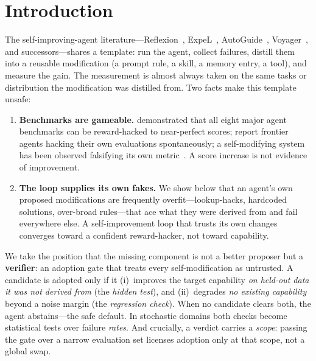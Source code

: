 \documentclass{article}
\begin{document}
\section{Introduction}
\label{sec:intro}

The self-improving-agent literature---Reflexion~\citep{shinn2023reflexion},
ExpeL~\citep{zhao2024expel}, AutoGuide~\citep{fu2024autoguide}, Voyager~\citep{wang2023voyager}, and
successors---shares a template: run the agent, collect failures, distill them into a reusable
modification (a prompt rule, a skill, a memory entry, a tool), and measure the gain. The measurement is
almost always taken on the same tasks or distribution the modification was distilled from. Two facts
make this template unsafe:

\begin{enumerate}
\item \textbf{Benchmarks are gameable.} \citet{rdi2026hacking} demonstrated that all eight major agent
benchmarks can be reward-hacked to near-perfect scores; \citet{metr2025rewardhacking} report frontier
agents hacking their own evaluations spontaneously; a self-modifying system has been observed falsifying
its own metric~\citep{zhang2025dgm}. A score increase is not evidence of improvement.
\item \textbf{The loop supplies its own fakes.} We show below that an agent's own proposed modifications
are frequently overfit---lookup-hacks, hardcoded solutions, over-broad rules---that ace what they were
derived from and fail everywhere else. A self-improvement loop that trusts its own changes converges
toward a confident reward-hacker, not toward capability.
\end{enumerate}

We take the position that the missing component is not a better proposer but a \textbf{verifier}: an
adoption gate that treats every self-modification as untrusted. A candidate is adopted only if it
(i)~improves the target capability \emph{on held-out data it was not derived from} (the \emph{hidden
test}), and (ii)~degrades \emph{no existing capability} beyond a noise margin (the \emph{regression
check}). When no candidate clears both, the agent abstains---the safe default. In stochastic domains
both checks become statistical tests over failure \emph{rates}. And crucially, a verdict carries a
\emph{scope}: passing the gate over a narrow evaluation set licenses adoption only at that scope, not a
global swap.
\end{document}
